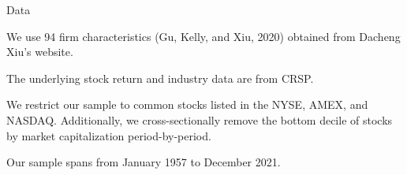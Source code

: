 \documentclass[11pt, aspectratio=169]{beamer}
\newenvironment{wideitemize}{\itemize\addtolength{\itemsep}{10pt}}{\enditemize}
\begin{document}

\begin{frame}{Data}
    \bigskip
    \begin{wideitemize}
    \item We use 94 firm characteristics (Gu, Kelly, and Xiu, 2020) obtained from Dacheng Xiu's website.
    \item The underlying stock return and industry data are from CRSP.
    \item We restrict our sample to common stocks listed in the NYSE, AMEX, and NASDAQ. Additionally, we cross-sectionally remove the bottom decile of stocks by market capitalization period-by-period.
    \item Our sample spans from January 1957 to December 2021.
    \end{wideitemize}
\end{frame}

\end{document}
